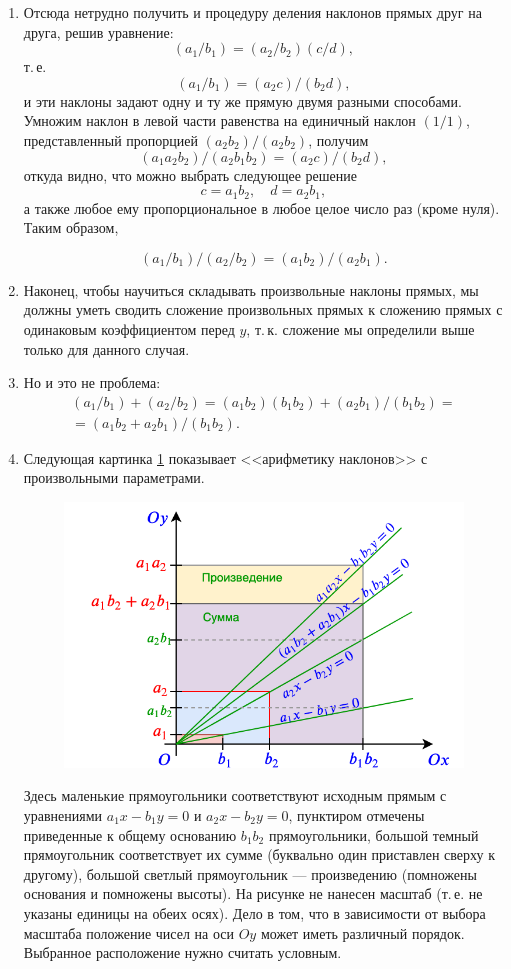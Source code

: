 \begin{enumerate}
\item Отсюда нетрудно получить и процедуру деления наклонов прямых друг на друга, решив уравнение:
$$
(a_1/b_1) = (a_2/b_2)(c/d),
$$
т.\,е.
$$
(a_1/b_1) = (a_2c)/(b_2d),
$$
и эти наклоны задают одну и ту же прямую двумя разными способами. Умножим наклон в левой части равенства на единичный наклон $(1/1)$, представленный пропорцией $(a_2b_2)/(a_2b_2)$, получим
$$
(a_1a_2b_2)/(a_2b_1b_2) = (a_2c)/(b_2d),
$$
откуда видно, что можно выбрать следующее решение
$$
c = a_1b_2,\quad d = a_2b_1,
$$
а также любое ему пропорциональное в любое целое число раз (кроме нуля). Таким образом,

$$
(a_1/b_1)/(a_2/b_2) = (a_1b_2)/(a_2b_1).
$$

\item Наконец, чтобы научиться складывать произвольные наклоны прямых, мы должны уметь сводить сложение произвольных прямых к сложению прямых с одинаковым коэффициентом перед $y$, т.\,к. сложение мы определили выше только для данного случая.
\item Но и это не проблема:
\begin{gather*}
(a_1/b_1)+(a_2/b_2) = (a_1b_2)(b_1b_2) + (a_2b_1)/(b_1b_2) = \\
= (a_1b_2+a_2b_1)/(b_1b_2).
\end{gather*}

\item Следующая картинка \ref{linear} показывает <<арифметику наклонов>> с произвольными параметрами.
\begin{figure}[htb!]
\begin{center}
\includegraphics[scale=0.5]{linear.png}
\end{center}
\caption{}\label{linear}
\end{figure}
Здесь маленькие прямоугольники соответствуют исходным прямым с уравнениями $a_1x-b_1y=0$ и $a_2x-b_2y=0$, пунктиром отмечены приведенные к общему основанию $b_1b_2$ прямоугольники, большой темный прямоугольник соответствует их сумме (буквально один приставлен сверху к другому), большой светлый прямоугольник --- произведению (помножены основания и помножены высоты). На рисунке не нанесен масштаб (т.\,е. не указаны единицы на обеих осях). Дело в том, что в зависимости от выбора масштаба положение чисел на оси $Oy$ может иметь различный порядок. Выбранное расположение нужно считать условным.


\end{enumerate}
